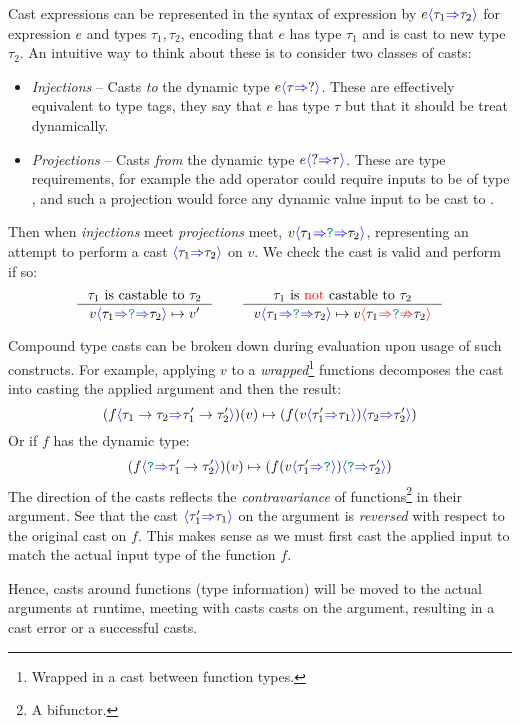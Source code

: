 Cast expressions can be represented in the syntax of expression by $e{\color{blue}\langle} \tau_1 {\color{blue}\Rightarrow} \tau_2 {\color{blue}\rangle}$ for expression $e$ and types $\tau_1, \tau_2$, encoding that $e$ has type $\tau_1$ and is cast to new type $\tau_2$. An intuitive way to think about these is to consider two classes of casts:
\begin{itemize}
\item \textit{Injections} -- Casts \textit{to} the dynamic type $e{\color{blue}\langle} \tau {\color{blue}\Rightarrow} ? {\color{blue}\rangle}$. These are effectively equivalent to type tags, they say that $e$ has type $\tau$ but that it should be treat dynamically.
\item \textit{Projections} -- Casts \textit{from} the dynamic type $e{\color{blue}\langle} ? {\color{blue}\Rightarrow} \tau {\color{blue}\rangle}$. These are type requirements, for example the add operator could require inputs to be of type , and such a projection would force any dynamic value input to be cast to . 
\end{itemize}
Then when \textit{injections} meet \textit{projections} meet, $v{\color{blue}\langle} \tau_1 {\color{blue}\Rightarrow} {\color{teal}\texttt{?}} {\color{blue}\Rightarrow} \tau_2 {\color{blue}\rangle}$, representing an attempt to perform a cast ${\color{blue}\langle} \tau_1 {\color{blue}\Rightarrow} \tau_2 {\color{blue}\rangle}$ on $v$. We check the cast is valid and perform if so:
\[\inference{\tau_1 \text{ is castable to } \tau_2}{v\scastcast{\tau_1}{\dyn}{\tau_2} \mapsto v'} \qquad \inference{\tau_1  \text{ is {\color{red} not }castable to }  \tau_2}{v\scastcast{\tau_1}{\dyn}{\tau_2} \mapsto v\scasterror{\tau_1}{\tau_2}}\]


Compound type casts can be broken down during evaluation upon usage of such constructs. For example, applying $v$ to a \textit{wrapped}\footnote{Wrapped in a cast between function types.} functions decomposes the cast into casting the applied argument and then the result:
\[(f{\color{blue}\langle} \tau_1 \to \tau_2 {\color{blue}\Rightarrow} \tau_1' \to \tau_2' {\color{blue}\rangle})(v) \mapsto (f(v {\color{blue}\langle} \tau_1' {\color{blue}\Rightarrow} \tau_1 {\color{blue}\rangle}){\color{blue}\langle} \tau_2 {\color{blue}\Rightarrow} \tau_2' {\color{blue}\rangle})\]
Or if $f$ has the dynamic type:
\[(f{\color{blue}\langle} {\color{teal}\texttt{?}} {\color{blue}\Rightarrow} \tau_1' \to \tau_2' {\color{blue}\rangle})(v) \mapsto (f(v {\color{blue}\langle} \tau_1' {\color{blue}\Rightarrow} {\color{teal}\texttt{?}} {\color{blue}\rangle}){\color{blue}\langle} {\color{teal}\texttt{?}} {\color{blue}\Rightarrow} \tau_2' {\color{blue}\rangle})\]
The direction of the casts reflects the \textit{contravariance} \cite[ch. 2]{BasicCatTheory} of functions\footnote{A bifunctor.} in their argument.
See that the cast ${\color{blue}\langle} \tau_1' {\color{blue}\Rightarrow} \tau_1 {\color{blue}\rangle}$ on the argument is \textit{reversed} with respect to the original cast on $f$. This makes sense as we must first cast the applied input to match the actual input type of the function $f$.

Hence, casts around functions (type information) will be moved to the actual arguments at runtime, meeting with casts casts on the argument, resulting in a cast error or a successful casts.

